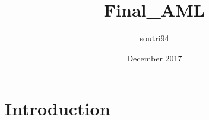 \documentclass{article}
\title{Final_AML}
\author{soutri94 }
\date{December 2017}
\begin{document}
\maketitle

\section{Introduction}
\end{document}
